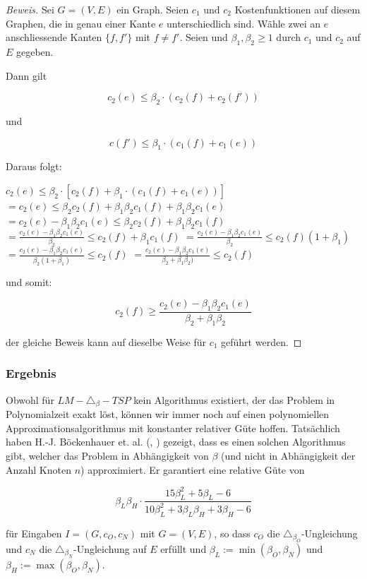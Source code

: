\documentclass[a4paper,11pt]{scrreprt}
\begin{document}
\begin{proof}[Beweis]
Sei $G = (V, E)$ ein Graph. Seien $c_1$ und $c_2$ Kostenfunktionen auf diesem Graphen, die in genau einer Kante $e$ unterschiedlich sind. Wähle zwei an $e$ anschliessende Kanten $\{f, f'\}$ mit $f \not= f'$. Seien und $\beta_1, \beta_2 \ge 1$ durch $c_1$ und $c_2$ auf $E$ gegeben. 

Dann gilt

\[ c_2(e) \le \beta_2 \cdot (c_2(f) + c_2(f')) \]

und 

\[ c(f') \le \beta_1 \cdot (c_1(f) + c_1(e)) \]

Daraus folgt:

$ c_2(e) \le \beta_2 \cdot [c_2(f) + \beta_1 \cdot (c_1(f) + c_1(e))] $ $ = c_2(e) \le \beta_2 c_2(f) + \beta_1\beta_2 c_1(f) + \beta_1\beta_2 c_1(e) $ $ = c_2(e) - \beta_1\beta_2 c_1(e) \le \beta_2 c_2(f) + \beta_1\beta_2 c_1(f) $ $ = \frac{c_2(e) - \beta_1\beta_2 c_1(e)}{\beta_2} \le c_2(f) + \beta_1 c_1(f) $ $ = \frac{c_2(e) - \beta_1\beta_2 c_1(e)}{\beta_2} \le c_2(f)(1 + \beta_1) $ $ = \frac{c_2(e) - \beta_1\beta_2 c_1(e)}{\beta_2(1 + \beta_1)} \le c_2(f) $ $ = \frac{c_2(e) - \beta_1\beta_2 c_1(e)}{\beta_2 + \beta_1\beta_2)} \le c_2(f) $

und somit:

\[ c_2(f) \ge  \frac{c_2(e) - \beta_1\beta_2 c_1(e)}{\beta_2 + \beta_1\beta_2} \]

der gleiche Beweis kann auf dieselbe Weise für $c_1$ geführt werden.
\end{proof}

\subsubsection{Ergebnis}

Obwohl für $LM-\triangle_\beta-TSP$ kein Algorithmus existiert, der das Problem in Polynomialzeit exakt löst, können wir immer noch auf einen polynomiellen Approximationsalgorithmus mit konstanter relativer Güte hoffen. Tatsächlich haben H.-J. Böckenhauer et. al. (\cite{bok1}, \cite{bok2}) gezeigt, dass es einen solchen Algorithmus gibt, welcher das Problem in Abhängigkeit von $\beta$ (und nicht in Abhängigkeit der Anzahl Knoten $n$) approximiert. Er garantiert eine  relative Güte von

\[ \beta_L\beta_H \cdot \frac{15\beta_L^2 + 5\beta_L - 6}{10\beta_L^2 + 3\beta_L\beta_H + 3\beta_H -6} \]

für Eingaben $I = (G, c_O, c_N)$ mit $G = (V, E)$, so dass $c_O$ die $\triangle_{\beta_O}$-Ungleichung und $c_N$ die $\triangle_{\beta_N}$-Ungleichung auf $E$ erfüllt und $\beta_L := \min(\beta_O,\beta_N)$ und $\beta_H := \max(\beta_O,\beta_N)$. 
\end{document}
